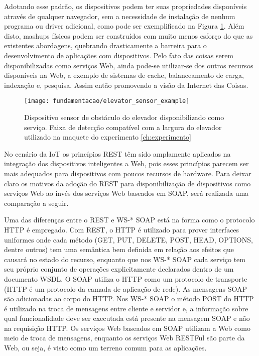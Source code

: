 Adotando esse padrão, os dispositivos podem ter suas propriedades disponíveis através de qualquer navegador, sem a necessidade de instalação de nenhum programa ou driver adicional, como pode ser exemplificado na Figura \ref{fig:dispnavegador}. Além disto, mashups físicos\footnotemark {} podem ser construídos com muito menos esforço do que as existentes abordagens, quebrando drasticamente a barreira para o desenvolvimento de aplicações com dispositivos\cite{Guinard:2009}. Pelo fato das coisas serem disponibilizadas como serviços Web, ainda pode-se utilizar-se dos outros recursos disponíveis na Web, a exemplo de sistemas de cache, balanceamento de carga, indexação e, pesquisa\cite{Franca:2011}. Assim então promovendo a visão da Internet das Coisas.

\begin{figure}[!htb] \centering 
  \centering
  \texttt{[image: fundamentacao/elevator\_sensor\_example]} 
  \caption{Dispositivo sensor de obstáculo do elevador disponibilizado como serviço. Faixa de detecção compatível com a largura do elevador utilizado na maquete do experimento    \ref{ch:experimento}} 
  \label{fig:dispnavegador}
\end{figure}

No cenário da IoT os princípios REST têm sido amplamente aplicados na integração dos dispositivos inteligentes a Web, pois esses princípios parecem ser mais adequados para dispositivos com poucos recursos de hardware\cite{Franca:2011}. Para deixar claro os motivos da adoção do REST para disponibilização de dispositivos como serviços Web ao invés dos serviços Web baseados em SOAP, será realizada uma comparação a seguir.

Uma das diferenças entre o REST e WS-* SOAP está na forma como o protocolo HTTP é empregado. Com REST, o HTTP é utilizado para prover interfaces uniformes onde cada método (GET, PUT, DELETE, POST, HEAD, OPTIONS, dentre outros) tem uma semântica bem definida em relação aos efeitos que causará no estado do recurso\cite{Franca:2011}, enquanto que nos WS-* SOAP cada serviço tem seu próprio conjunto de operações explicitamente declarados dentro de um documento WSDL\cite{Pautasso:2014}. O SOAP utiliza o HTTP como um protocolo de transporte (HTTP é um protocolo da camada de aplicação de rede). As mensagens SOAP são adicionadas ao corpo do HTTP. Nos WS-* SOAP o método POST do HTTP é utilizado na troca de mensagens entre cliente e servidor e, a informação sobre qual funcionalidade deve ser executada está presente na mensagem SOAP e não na requisição HTTP. Os serviços Web baseados em SOAP utilizam a Web como meio de troca de mensagens, enquanto os serviços Web RESTFul são parte da Web, ou seja, é visto como um terreno comum para as aplicações\cite{Franca:2011}.

